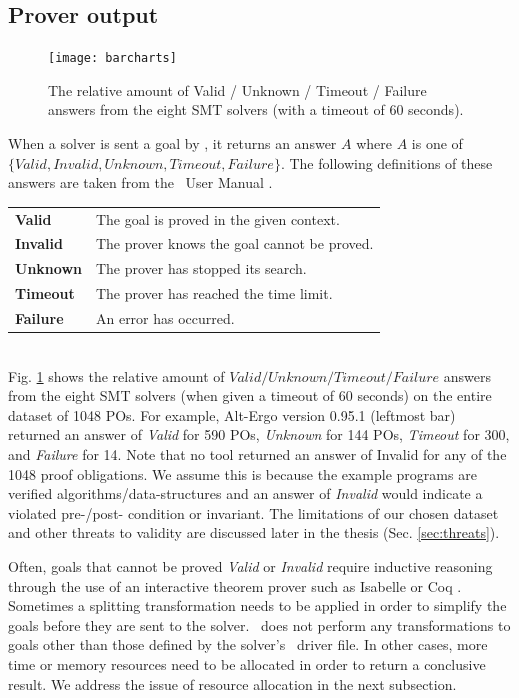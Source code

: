 \subsection{Prover output}
\label{sub:prover-output}

\begin{figure}
	\centering
	\texttt{[image: barcharts]}
	\caption[The relative amount of Valid / Unknown / Timeout / Failure answers from the eight SMT solvers]{The relative amount of Valid / Unknown / Timeout / Failure answers from the eight SMT solvers (with a timeout of 60 seconds). }
	\label{fig:barcharts}
\end{figure}


When a solver is sent a goal by \why, it returns an answer $A$ where $A$ is one of $\lbrace Valid,Invalid,Unknown,Timeout,Failure \rbrace$. The following definitions of these answers are taken from the \why~User Manual \cite{why:manual}.\\  

\begin{tabularx}
	{\textwidth}{@{}ll@{}}
	\textbf{Valid}   & The goal is proved in the given context. \\
	\textbf{Invalid} & The prover knows the goal cannot be proved. \\  
	\textbf{Unknown} & The prover has stopped its search.\\
	\textbf{Timeout} & The prover has reached the time limit. \\
	\textbf{Failure} & An error has occurred. \\
\end{tabularx}\\

Fig. \ref{fig:barcharts} shows the relative amount of $Valid / Unknown / Timeout / Failure$ answers from the eight SMT solvers (when given a timeout of 60 seconds) on the entire dataset of 1048 POs. 
For example, Alt-Ergo version 0.95.1 (leftmost bar) returned an answer of \textit{Valid} for 590 POs, \textit{Unknown} for 144 POs, \textit{Timeout} for 300, and \textit{Failure} for 14.
Note that no tool returned an answer of Invalid for any of the 1048 proof obligations.
We assume this is because the example programs are verified algorithms/data-structures and an answer of \textit{Invalid} would indicate a violated pre-/post- condition or invariant.
The limitations of our chosen dataset and other threats to validity are discussed later in the thesis (Sec. \ref{sec:threats}).

Often, goals that cannot be proved \textit{Valid} or \textit{Invalid} require inductive reasoning through the use of an interactive theorem prover such as Isabelle \cite{Isabelle} or Coq \cite{Coq}. 
Sometimes a splitting transformation needs to be applied in order to simplify the goals before they are sent to the solver. 
\where~does not perform any transformations to goals other than those defined by the solver's \why~driver file. 
In other cases, more time or memory resources need to be allocated in order to return a conclusive result. 
We address the issue of resource allocation in the next subsection.    

